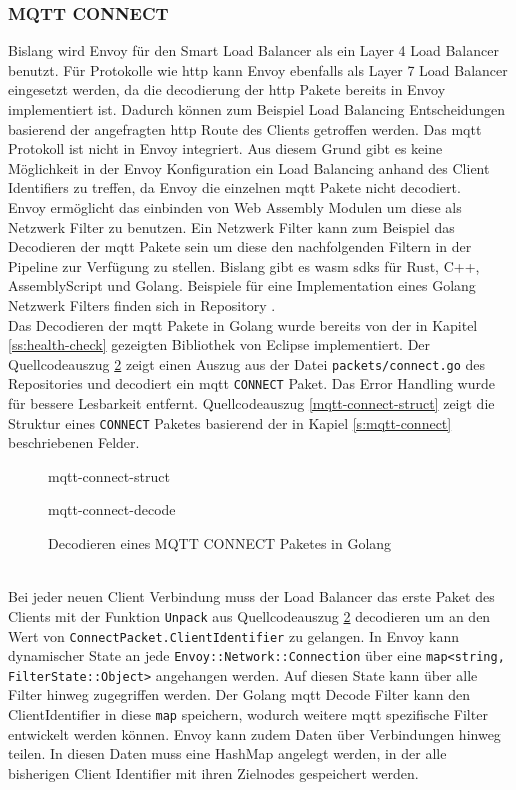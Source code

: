 \subsubsection{MQTT CONNECT}
Bislang wird Envoy für den Smart Load Balancer als ein Layer 4 Load Balancer benutzt. Für Protokolle wie \ac{http} kann Envoy ebenfalls als Layer 7 Load Balancer eingesetzt werden, da die decodierung der \ac{http} Pakete bereits in Envoy implementiert ist. Dadurch können zum Beispiel Load Balancing Entscheidungen basierend der angefragten \ac{http} Route des Clients getroffen werden.
Das \ac{mqtt} Protokoll ist nicht in Envoy integriert. Aus diesem Grund gibt es keine Möglichkeit in der Envoy Konfiguration ein Load Balancing anhand des Client Identifiers zu treffen, da Envoy die einzelnen \ac{mqtt} Pakete nicht decodiert.
\\
Envoy ermöglicht das einbinden von Web Assembly Modulen um diese als Netzwerk Filter zu benutzen. Ein Netzwerk Filter kann zum Beispiel das Decodieren der \ac{mqtt} Pakete sein um diese den nachfolgenden Filtern in der Pipeline zur Verfügung zu stellen. Bislang gibt es \ac{wasm} \acp{sdk} für Rust, C++, AssemblyScript und Golang. \cite{sebastianHowWriteWASM} Beispiele für eine Implementation eines Golang Netzwerk Filters finden sich in Repository \cite{TetratelabsProxywasmgosdk2021}.
\\
Das Decodieren der \ac{mqtt} Pakete in Golang wurde bereits von der in Kapitel \ref{ss:health-check} gezeigten Bibliothek von Eclipse implementiert. Der Quellcodeauszug \ref{code:mqtt-connect-decode} zeigt einen Auszug aus der Datei \verb|packets/connect.go| des Repositories und decodiert ein \ac{mqtt} \verb|CONNECT| Paket. Das Error Handling wurde für bessere Lesbarkeit entfernt. Quellcodeauszug \ref{mqtt-connect-struct} zeigt die Struktur eines \verb|CONNECT| Paketes basierend der in Kapiel \ref{s:mqtt-connect} beschriebenen Felder.
\begin{figure}
    {mqtt-connect-struct}
    \caption{}
    \label{code:mqtt-connect-struct}
\end{figure}
\begin{figure}
    {mqtt-connect-decode}
    \caption{Decodieren eines MQTT CONNECT Paketes in Golang \cite{EclipsePahoMqtt2021}}
    \label{code:mqtt-connect-decode}
\end{figure}
\\
Bei jeder neuen Client Verbindung muss der Load Balancer das erste Paket des Clients mit der Funktion \verb|Unpack| aus Quellcodeauszug \ref{code:mqtt-connect-decode} decodieren um an den Wert von \verb|ConnectPacket.ClientIdentifier| zu gelangen. In Envoy kann dynamischer State an jede \verb|Envoy::Network::Connection| über eine \verb|map<string, FilterState::Object>| angehangen werden. Auf diesen State kann über alle Filter hinweg zugegriffen werden. Der Golang \ac{mqtt} Decode Filter kann den ClientIdentifier in diese \verb|map| speichern, wodurch weitere \ac{mqtt} spezifische Filter entwickelt werden können.
Envoy kann zudem Daten über Verbindungen hinweg teilen. In diesen Daten muss eine HashMap angelegt werden, in der alle bisherigen Client Identifier mit ihren Zielnodes gespeichert werden.\cite{SharingDataFilters}


